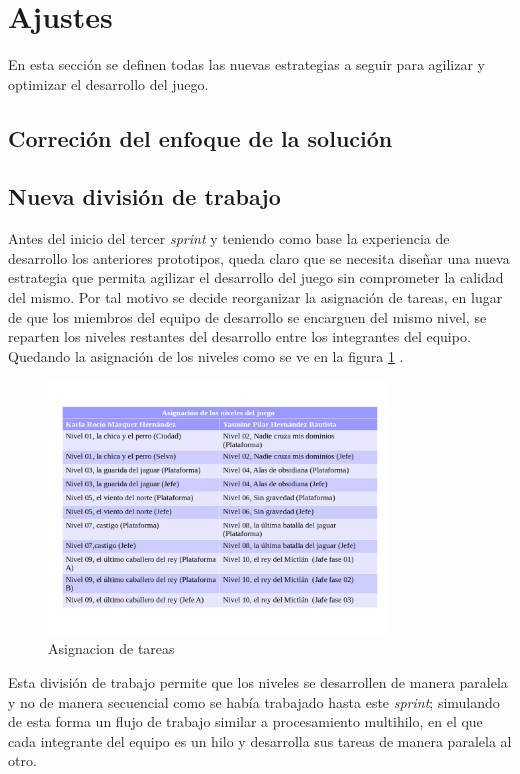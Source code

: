 \section{Ajustes}
En esta sección se definen todas las nuevas estrategias a seguir para agilizar y 
optimizar el desarrollo del juego.

\subsection{Correción del enfoque de la solución}

\subsection{Nueva división de trabajo}
Antes del inicio del tercer \textit{sprint} y teniendo como base la experiencia 
de desarrollo los anteriores prototipos, queda claro que se necesita diseñar una 
nueva estrategia que permita agilizar el desarrollo del juego sin comprometer 
la calidad del mismo. Por tal motivo se decide reorganizar la asignación de 
tareas, en lugar de que los miembros del equipo de desarrollo se encarguen del 
mismo nivel, se reparten los niveles restantes del desarrollo entre los 
integrantes del equipo. Quedando la asignación de los niveles como se ve en la 
figura \ref{fig:Tareas} .

		\begin{figure}[h]
    			\centering
    			\includegraphics[width=0.8\textwidth]{02Antecedentes/Imagenes/tareasAsignacion.png}
    			\caption{Asignacion de tareas}
    			\label{fig:Tareas}
		\end{figure}


Esta división de trabajo permite que los niveles se desarrollen de manera paralela y no de manera secuencial como se había trabajado hasta este \textit{sprint}; simulando de esta forma un flujo de trabajo similar a procesamiento multihilo, en el que cada integrante del equipo es un hilo y desarrolla sus tareas de manera paralela al otro.


